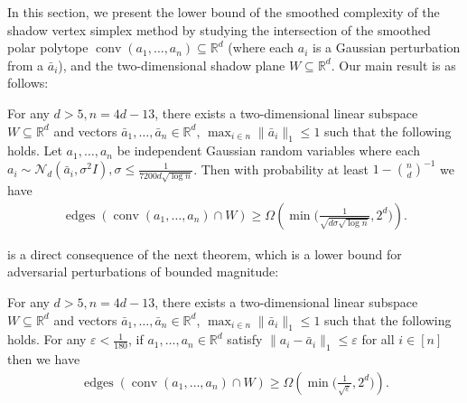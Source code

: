 \documentclass{theoretics}
\newcommand{\R}{\mathbb R}
\newcommand{\eps}{\varepsilon} %
\newcommand{\conv}{\operatorname{conv}}
\newcommand{\edges}{\operatorname{edges}}
\renewcommand{\subset}{\subseteq}
\begin{document}
In this section, we present the lower bound of the smoothed complexity of the shadow vertex simplex method by studying the intersection of the smoothed polar polytope \mbox{$\conv(a_1, \ldots, a_n) \subset \R^d$} (where each $a_i$ is a Gaussian perturbation from a $\bar a_i$), and the two-dimensional shadow plane $W \subset \R^d$. Our main result is as follows:

\begin{theorem}\label{thm:lb-main}
    For any $d > 5, n = 4d - 13$, there exists a two-dimensional linear subspace $W \subset \R^{d}$ and vectors $\bar a_1,\ldots,\bar a_n \in \R^d$, $\max_{i \in n} \|\bar{a}_i\|_1 \leq 1$ such that the following holds. 
    Let $a_1, \ldots, a_n$ be independent Gaussian random variables where each $a_i \sim \mathcal{N}_d(\bar{a}_i, \sigma^2 I), \sigma \leq \frac{1}{7200d\sqrt{\log n}}$.
    Then with probability at least $1 - \binom{n}{d}^{-1}$ we have
    \begin{align*} 
        \edges(\conv(a_1,\ldots,a_n) \cap W) \geq \Omega \left(\min \Big(\frac{1}{\sqrt{d\sigma\sqrt{\log n}}},2^d \Big) \right).
    \end{align*}
\end{theorem}

 is a direct consequence of the next theorem, which is a lower bound for adversarial perturbations of bounded magnitude:
\begin{theorem}\label{thm:lb-generic}
    For any $d > 5, n = 4d-13$, there exists a two-dimensional linear subspace $W \subset \R^{d}$ and vectors $\bar a_1,\ldots,\bar a_n \in \R^d$, $\max_{i \in n} \|\bar{a}_i\|_1 \leq 1$ such that the following holds. 
    For any $\eps < \frac{1}{180}$, if $a_1, \ldots, a_n \in \R^d$ satisfy $\|a_i - \bar a_i\|_1 \leq \eps$ for all $i \in [n]$
    then we have
    \begin{align*} 
        \edges(\conv(a_1,\ldots,a_n) \cap W) \geq \Omega \left(\min \Big(\frac{1}{\sqrt{\eps}},2^d \Big) \right).
    \end{align*}
\end{theorem}
\end{document}

